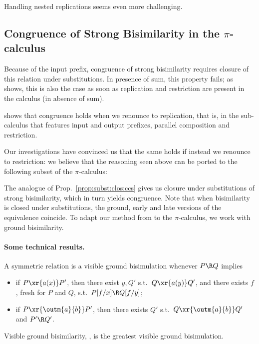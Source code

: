 \documentclass{llncs}
\newif\iflong \longfalse
\begin{document}
Handling nested replications seems even more challenging.

\subsection{Congruence of Strong Bisimilarity in the $\pi$-calculus}
\label{sec:pi}


Because of the input prefix, congruence of strong bisimilarity
requires closure of this relation under substitutions. 
In presence of sum, this property fails; as~\cite{SW01} shows, this is
also the case as soon as replication and restriction are present in
the calculus (in absence of sum).

\cite{hirschkoff:pous:lmcs:08} shows that congruence holds when we
renounce to replication, that is, in the sub-calculus that features
input and output prefixes, parallel composition and restriction.

Our investigations have convinced us that the same holds if instead we
renounce to restriction: we believe that the reasoning seen above can
be ported to the following subset of the $\pi$-calculus:
The analogue of Prop.~\ref{prop:subst:clos:ccs} gives us closure under
substitutions of strong bisimilarity, which in turn yields congruence.
Note that when bisimilarity is closed under substitutions, the ground,
early and late versions of the equivalence coincide. To adapt our
method from \miniccs{} to the $\pi$-calculus, we work with ground
bisimilarity.

\iflong
\paragraph{Some technical results.}





\begin{defi}
  A symmetric relation \R{} is a visible ground bisimulation whenever
  $P\R Q$ implies
  \begin{itemize}
  \item if $P\xr{a(x)}P'$, then there exist $y,Q'$ s.t.\ 
    $Q\xr{a(y)}Q'$, and there exists $f$, fresh for $P$ and $Q$, s.t.\ 
    $P[f/x] \R Q[f/y]$;
  \item if $P\xr{\outm{a}{b}}P'$, then there exists $Q'$ s.t.\
    $Q\xr{\outm{a}{b}}Q'$ and $P'\R Q'$.
  \end{itemize}
  Visible ground bisimilarity, \visgr, is the greatest visible ground
  bisimulation.
\end{defi}
\end{document}
